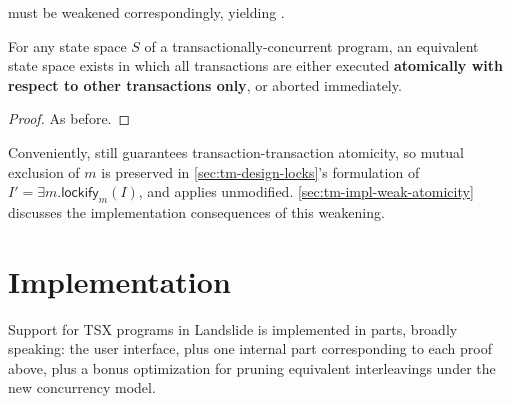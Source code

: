 { must be weakened correspondingly, yielding .
\vspace{1em}

\begin{theorem}
	\label{thm:atom-weak}
	For any state space $S$ of a transactionally-concurrent program,
	an equivalent state space exists in which all transactions are either executed
	{\bf atomically
	with respect to other transactions only},
	or aborted immediately.
\end{theorem}

\begin{proof}
	As before.
\end{proof}


Conveniently,
 still guarantees transaction-transaction atomicity,
so mutual exclusion of $m$ is preserved
in \cref{sec:tm-design-locks}'s formulation of
$I' = \exists m. \mathsf{lockify}_m(I)$,
and
 applies unmodified.
\cref{sec:tm-impl-weak-atomicity}
discusses the implementation consequences of this weakening.}


\section{Implementation}
\label{sec:tm-implementation}

Support for TSX programs in Landslide is implemented in  parts, broadly speaking:
the user interface,
plus one internal part corresponding to each proof above,
plus a bonus optimization for pruning equivalent interleavings under the new concurrency model.

